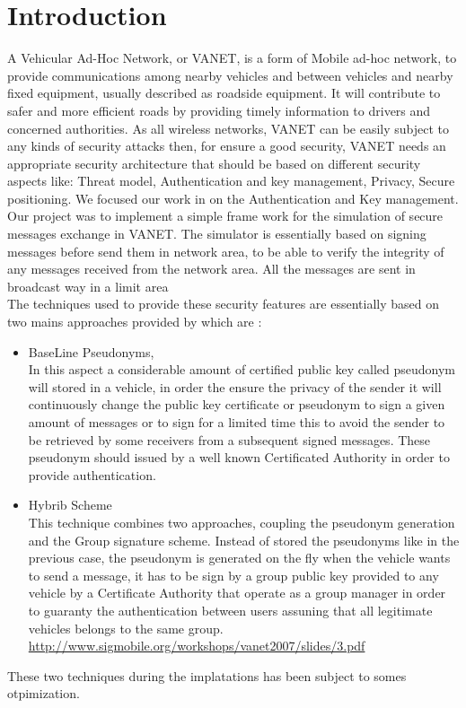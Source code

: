 \section{Introduction}
A Vehicular Ad-Hoc Network, or VANET, is a form of Mobile ad-hoc network, to provide communications among nearby vehicles and between vehicles and nearby fixed equipment, usually described as roadside equipment. It will contribute to safer and more efficient roads by providing timely information to drivers and concerned authorities.
As all wireless networks, VANET can be easily subject to any kinds of security  attacks then, for ensure a good security, VANET needs an appropriate security architecture that should be based on different security aspects like: Threat model, Authentication and key management, Privacy, Secure positioning. We focused our work in on the  Authentication and Key management.\\
Our project was to implement a simple frame work for the simulation of secure messages exchange in VANET. The simulator is essentially based on  signing  messages before send them in network area, to be able to verify the integrity of any messages received from the network area. All the messages are sent in broadcast way in a limit area\\
The techniques used to provide these security features are essentially based on two mains approaches provided
 by\cite{calandriello} which are :
\begin{itemize}
\item BaseLine Pseudonyms,\\
In this aspect a considerable amount of certified public key called pseudonym  will stored in a vehicle, in order the ensure the privacy of the sender it will continuously change the public key certificate or pseudonym to sign a given amount of messages or to sign for a limited time this to avoid the sender to be retrieved by some receivers from a subsequent signed messages. These pseudonym should issued by a well known Certificated Authority in order to provide authentication.

\item Hybrib Scheme\\
This technique combines two approaches, coupling the pseudonym generation and the Group signature scheme.
Instead of stored the pseudonyms like in the previous case, the pseudonym  is generated on the fly when the vehicle wants to send a message, it has to be sign by a group public key provided to any vehicle by a Certificate Authority that operate as a group manager in order to guaranty the authentication between users assuning that all legitimate vehicles belongs to the same group.
\\
\url{http://www.sigmobile.org/workshops/vanet2007/slides/3.pdf}
\end{itemize}
These two techniques during the implatations has been subject to somes otpimization.
